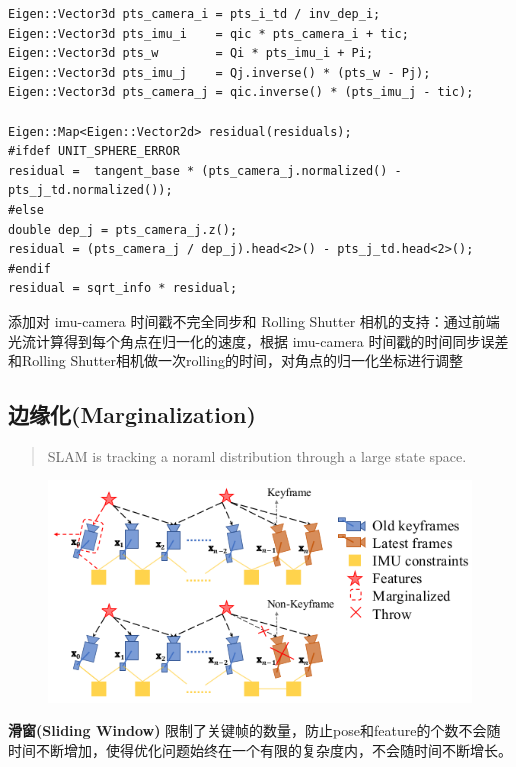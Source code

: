 \documentclass[12pt,a4paper]{article}
\begin{document}
\begin{enumerate}
\begin{lstlisting}
Eigen::Vector3d pts_camera_i = pts_i_td / inv_dep_i;
Eigen::Vector3d pts_imu_i    = qic * pts_camera_i + tic;
Eigen::Vector3d pts_w        = Qi * pts_imu_i + Pi;
Eigen::Vector3d pts_imu_j    = Qj.inverse() * (pts_w - Pj);
Eigen::Vector3d pts_camera_j = qic.inverse() * (pts_imu_j - tic);

Eigen::Map<Eigen::Vector2d> residual(residuals);
#ifdef UNIT_SPHERE_ERROR
residual =  tangent_base * (pts_camera_j.normalized() - pts_j_td.normalized());
#else
double dep_j = pts_camera_j.z();
residual = (pts_camera_j / dep_j).head<2>() - pts_j_td.head<2>();
#endif
residual = sqrt_info * residual;
\end{lstlisting}

添加对 imu-camera 时间戳不完全同步和 Rolling Shutter 相机的支持：通过前端光流计算得到每个角点在归一化的速度，根据 imu-camera 时间戳的时间同步误差和Rolling Shutter相机做一次rolling的时间，对角点的归一化坐标进行调整

\end{enumerate}

\subsection{边缘化(Marginalization)}

\begin{quote}
SLAM is tracking a noraml distribution through a large state space.
\end{quote}

\begin{figure}[htbp]
\centering
\includegraphics[scale=0.6]{images/marginalization.png}
\end{figure}

\textbf{滑窗(Sliding Window)} 限制了关键帧的数量，防止pose和feature的个数不会随时间不断增加，使得优化问题始终在一个有限的复杂度内，不会随时间不断增长。
\end{document}
